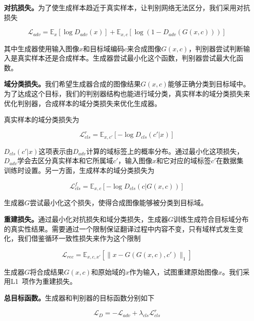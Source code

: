 \textbf{对抗损失。}为了使生成样本趋近于真实样本，让判别网络无法区分，我们采用对抗损失 

\begin{equation}
\label{equ:adv_exp2}
\mathcal{L}_{adv} = \mathbb{E}_x[\log D_{adv}(x)] + \mathbb{E}_{x,c}[\log(1-D_{adv}(G(x,c)))]
\end{equation}

其中生成器使用输入图像$x$和目标域编码$c$来合成图像$G(x,c)$，判别器尝试判断输入是真实样本还是合成样本。生成器尝试最小化这个函数，判别器尝试最大化函数。

\textbf{域分类损失。}我们希望生成器合成的图像结果$G(x,c)$能够正确分类到目标域中。为了达成这个目标，我们的判别器结构也能进行域分类，真实样本的域分类损失来优化判别器，合成样本的域分类损失来优化生成器。

真实样本的域分类损失为

\begin{equation}
\label{equ:cls_real_exp2}
\mathcal{L}_{cls}^{r} = \mathbb{E}_{x,c'}[-\log D_{cls}(c'|x)]
\end{equation}

$D_{cls}(c'|x)$这项表示由$D_{adv}$计算的域标签上的概率分布。通过最小化这项损失，$D_{adv}$学会去区分真实样本和它所属域$c'$，输入图像$x$和它对应的域标签$c'$在数据集训练时设置。另一方面，生成样本的域分类损失为

\begin{equation}
\label{equ:cls_fake_exp2}
\mathcal{L}_{cls}^{f} = \mathbb{E}_{x,c}[-\log D_{cls}(c|G(x,c))]
\end{equation}

生成器$G$尝试最小化这个损失，使得合成图像能够被分类到目标域。

\textbf{重建损失。}通过最小化对抗损失和域分类损失，生成器$G$训练生成符合目标域分布的真实性结果。需要通过一个限制保证翻译过程中内容不变，只有域样式发生变化，我们借鉴循环一致性损失来作为这个限制

\begin{equation}
\label{equ:rec_exp2}
\mathcal{L}_{rec} = \mathbb{E}_{x,c,x'}[\| x-G(G(x,c),c') \|_1]
\end{equation}

生成器$G$将合成结果$G(x,c)$和原始域的$x$作为输入，试图重建原始图像$x$。我们采用L1~\cite{shrivastava2017learning}项作为重建损失。

\textbf{总目标函数。}生成器和判别器的目标函数分别如下

\begin{equation}
\label{equ:D_exp2}
\mathcal{L}_{D} = -\mathcal{L}_{adv} + \lambda_{cls}\mathcal{L}_{cls}^{r}
\end{equation}

